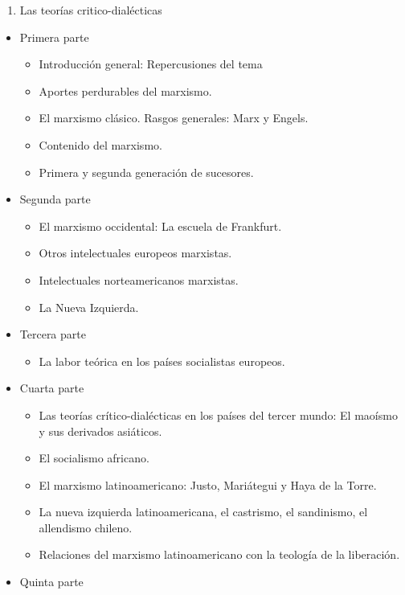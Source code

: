 \documentclass[
]{book}
\providecommand{\tightlist}{%
  \setlength{\itemsep}{0pt}\setlength{\parskip}{0pt}}
\begin{document}
\begin{enumerate}
\def\labelenumi{\arabic{enumi}.}
\setcounter{enumi}{4}
\tightlist
\item
  Las teorías critico-dialécticas
\end{enumerate}

\begin{itemize}
\tightlist
\item
  Primera parte

  \begin{itemize}
  \tightlist
  \item
    Introducción general: Repercusiones del tema
  \item
    Aportes perdurables del marxismo.
  \item
    El marxismo clásico. Rasgos generales: Marx y Engels.
  \item
    Contenido del marxismo.
  \item
    Primera y segunda generación de sucesores.
  \end{itemize}
\item
  Segunda parte

  \begin{itemize}
  \tightlist
  \item
    El marxismo occidental: La escuela de Frankfurt.
  \item
    Otros intelectuales europeos marxistas.
  \item
    Intelectuales norteamericanos marxistas.
  \item
    La Nueva Izquierda.
  \end{itemize}
\item
  Tercera parte

  \begin{itemize}
  \tightlist
  \item
    La labor teórica en los países socialistas europeos.
  \end{itemize}
\item
  Cuarta parte

  \begin{itemize}
  \tightlist
  \item
    Las teorías crítico-dialécticas en los países del tercer mundo: El maoísmo y sus derivados asiáticos.
  \item
    El socialismo africano.
  \item
    El marxismo latinoamericano: Justo, Mariátegui y Haya de la Torre.
  \item
    La nueva izquierda latinoamericana, el castrismo, el sandinismo, el allendismo chileno.
  \item
    Relaciones del marxismo latinoamericano con la teología de la liberación.
  \end{itemize}
\item
  Quinta parte


\end{itemize}
\end{document}
